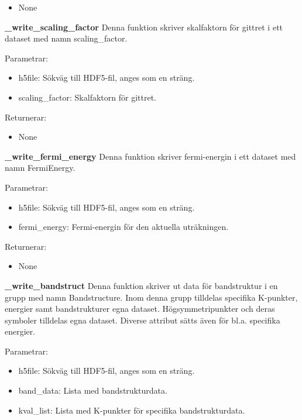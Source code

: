 \documentclass[10pt,oneside,swedish]{article}
\providecommand{\tightlist}{%
  \setlength{\itemsep}{0pt}\setlength{\parskip}{0pt}}
\begin{document}
\begin{itemize}
\tightlist
\item
  None
\end{itemize}

\textbf{\_write\_scaling\_factor} Denna funktion skriver skalfaktorn för
gittret i ett dataset med namn scaling\_factor.

Parametrar:

\begin{itemize}
\tightlist
\item
  h5file: Sökväg till HDF5-fil, anges som en sträng.
\item
  scaling\_factor: Skalfaktorn för gittret.
\end{itemize}

Returnerar:

\begin{itemize}
\tightlist
\item
  None
\end{itemize}

\textbf{\_write\_fermi\_energy} Denna funktion skriver fermi-energin i
ett dataset med namn FermiEnergy.

Parametrar:

\begin{itemize}
\tightlist
\item
  h5file: Sökväg till HDF5-fil, anges som en sträng.
\item
  fermi\_energy: Fermi-energin för den aktuella uträkningen.
\end{itemize}

Returnerar:

\begin{itemize}
\tightlist
\item
  None
\end{itemize}

\textbf{\_write\_bandstruct} Denna funktion skriver ut data för
bandstruktur i en grupp med namn Bandstructure. Inom denna grupp
tilldelas specifika K-punkter, energier samt bandstrukturer egna
dataset. Högsymmetripunkter och deras symboler tilldelas egna dataset.
Diverse attribut sätts även för bl.a. specifika energier.

Parametrar:

\begin{itemize}
\tightlist
\item
  h5file: Sökväg till HDF5-fil, anges som en sträng.
\item
  band\_data: Lista med bandstrukturdata.
\item
  kval\_list: Lista med K-punkter för specifika bandstrukturdata.
\end{itemize}
\end{document}
